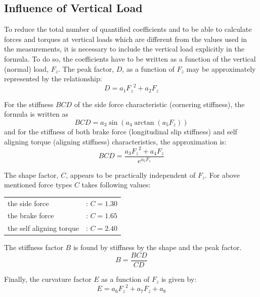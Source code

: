 \documentclass[12pt]{article}
\begin{document}
\subsection{Influence of Vertical Load}
\par To
reduce the total number of quantified coefficients and to be able to calculate forces and
torques at vertical loads which are different from
the values used in the measurements, it is necessary to include the vertical load explicitly in the
formula. To do so, the coefficients have to be written as a function of the vertical (normal) load, $F_z$. The peak factor, $D$, as a function of $F_z$ may be
approximately represented by the relationship:
\begin{equation}
\label{eqn:tire_model_peak_factor}
D = a_1{F_z}^2 + a_2{F_z}
\end{equation}
\par For the stiffness $BCD$ of the side force characteristic (cornering stiffness), the formula is written as
\begin{equation}
\label{eqn:tire_model_cornering stiffness}
BCD = a_3\sin(a_4\arctan(a_5{F_z}))
\end{equation}
and for the stiffness of both brake force (longitudinal slip stiffness) and self aligning torque (aligning stiffness) characteristics, the approximation is: 
\begin{equation}
\label{eqn:tire_model_longitudinal slip stiffness_aligning stiffness}
BCD = \frac{a_3{F_z}^2 + a_4F_z}{e^{a_5{F_z}}}
\end{equation}
\par The shape factor, $C$, appears to be practically
independent of $F_z$. For above mentioned force types $C$ takes following values: 
\newline \par 
\begin{tabular}{@{$\bullet$ }ll}
	the side force  &: $C = 1.30$ \\
	the brake force &: $C = 1.65$ \\
	the self aligning torque &: $C = 2.40$
\end{tabular}
The stiffness factor $B$ is found by
stiffness by the shape and the peak factor.
\begin{equation}
\label{eqn:tire_model_stiffness_factor}
B = \frac{BCD}{CD}
\end{equation}
\par Finally, the curvature factor $E$ as a function of $F_z$ is given by:
\begin{equation}
\label{eqn:tire_model_curvature_factor}
E = a_6{F_z}^{2} + a_7{F_z} + a_8
\end{equation}
\end{document}
